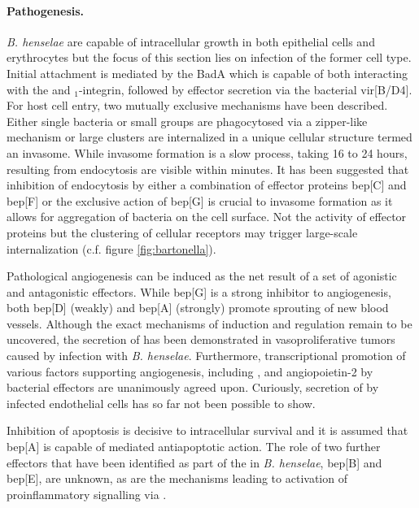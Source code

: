 \paragraph{Pathogenesis.}
\textit{B. henselae} are capable of intracellular growth in both epithelial cells and erythrocytes but the focus of this section lies on infection of the former cell type. Initial attachment is mediated by the  BadA which is capable of both interacting with the  and \textbeta$_1$-integrin, followed by effector secretion via the bacterial  \acrshort{vir}[B\slash D4]. For host cell entry, two mutually exclusive mechanisms have been described. Either single bacteria or small groups are phagocytosed via a zipper-like mechanism or large clusters are internalized in a unique cellular structure termed an invasome. While invasome formation is a slow process, taking 16 to 24 hours,  resulting from endocytosis are visible within minutes. It has been suggested that inhibition of endocytosis by either a combination of effector proteins \acrshort{bep}[C] and \acrshort{bep}[F] or the exclusive action of \acrshort{bep}[G] is crucial to invasome formation as it allows for aggregation of bacteria on the cell surface. Not the activity of effector proteins but the clustering of cellular receptors may trigger large-scale internalization (c.f. figure \ref{fig:bartonella}).

Pathological angiogenesis can be induced as the net result of a set of agonistic and antagonistic effectors. While \acrshort{bep}[G] is a strong inhibitor to angiogenesis, both \acrshort{bep}[D] (weakly) and \acrshort{bep}[A] (strongly) promote sprouting of new blood vessels. Although the exact mechanisms of induction and regulation remain to be uncovered, the secretion of  has been demonstrated in vasoproliferative tumors caused by infection with \textit{B. henselae}. Furthermore, transcriptional promotion of various factors supporting angiogenesis, including ,  and angiopoietin-2 by bacterial effectors are unanimously agreed upon. Curiously, secretion of  by infected endothelial cells has so far not been possible to show.

Inhibition of apoptosis is decisive to intracellular survival and it is assumed that \acrshort{bep}[A] is capable of  mediated antiapoptotic action. The role of two further effectors that have been identified as part of the  in \textit{B. henselae}, \acrshort{bep}[B] and \acrshort{bep}[E], are unknown, as are the mechanisms leading to activation of proinflammatory signalling via .

